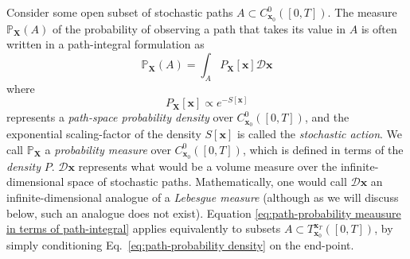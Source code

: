Consider some open subset of stochastic paths $A \subset C_{\mathbf{x}_0}^0([0,T])$. The measure $\mathbb{P}_\mathbf{X}(A)$ of the probability of observing a path that takes its value in $A$ is often written in a path-integral formulation as \citep{huntPathIntegralSolutions1981, adibStochasticActionsDiffusive2008, chaichianPathIntegralsPhysics2001}
\begin{equation} \label{eq:path-probability meausure in terms of path-integral}
\mathbb{P}_\mathbf{X}(A) = \int_A P_\mathbf{X}[\mathbf{x}] \mathcal{D} \mathbf{x}
\end{equation}
where
\begin{equation} \label{eq:path-probability density}
P_\mathbf{X}[\mathbf{x}] \propto e^{-S[\mathbf{x}]}
\end{equation}
represents a \textit{path-space probability density} over $C_{\mathbf{x}_0}^0([0,T])$, and the exponential scaling-factor of the density $S[\mathbf{x}]$ is called the \textit{stochastic action}. We call $\mathbb{P}_\mathbf{X}$ a \textit{probability measure} over $C_{\mathbf{x}_0}^0([0,T])$, which is defined in terms of the \textit{density} $P$. $\mathcal{D} \mathbf{x}$ represents what would be a volume measure over the infinite-dimensional space of stochastic paths. Mathematically, one would call $\mathcal{D} \mathbf{x}$ an infinite-dimensional analogue of a \textit{Lebesgue measure} (although as we will discuss below, such an analogue does not exist). Equation \ref{eq:path-probability meausure in terms of path-integral} applies equivalently to subsets $A \subset T_{\mathbf{x}_0}^{\mathbf{x}_T}([0,T])$, by simply conditioning Eq.~\ref{eq:path-probability density} on the end-point.

